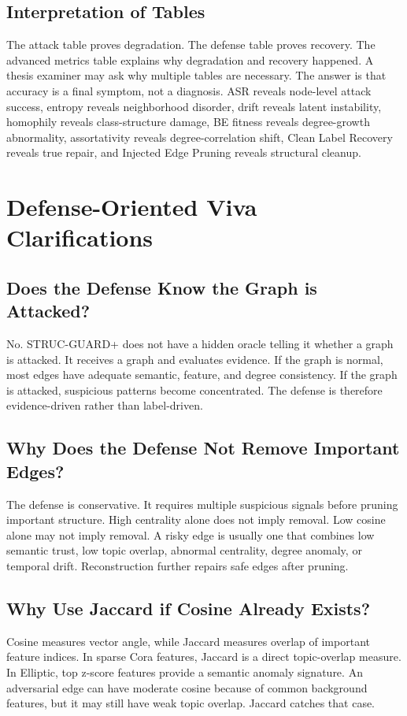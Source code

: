 \documentclass[12pt,oneside]{report}
\begin{document}
\section{Interpretation of Tables}
The attack table proves degradation. The defense table proves recovery. The advanced metrics table explains why degradation and recovery happened. A thesis examiner may ask why multiple tables are necessary. The answer is that accuracy is a final symptom, not a diagnosis. ASR reveals node-level attack success, entropy reveals neighborhood disorder, drift reveals latent instability, homophily reveals class-structure damage, BE fitness reveals degree-growth abnormality, assortativity reveals degree-correlation shift, Clean Label Recovery reveals true repair, and Injected Edge Pruning reveals structural cleanup.

\chapter{Defense-Oriented Viva Clarifications}

\section{Does the Defense Know the Graph is Attacked?}
No. STRUC-GUARD+ does not have a hidden oracle telling it whether a graph is attacked. It receives a graph and evaluates evidence. If the graph is normal, most edges have adequate semantic, feature, and degree consistency. If the graph is attacked, suspicious patterns become concentrated. The defense is therefore evidence-driven rather than label-driven.

\section{Why Does the Defense Not Remove Important Edges?}
The defense is conservative. It requires multiple suspicious signals before pruning important structure. High centrality alone does not imply removal. Low cosine alone may not imply removal. A risky edge is usually one that combines low semantic trust, low topic overlap, abnormal centrality, degree anomaly, or temporal drift. Reconstruction further repairs safe edges after pruning.

\section{Why Use Jaccard if Cosine Already Exists?}
Cosine measures vector angle, while Jaccard measures overlap of important feature indices. In sparse Cora features, Jaccard is a direct topic-overlap measure. In Elliptic, top z-score features provide a semantic anomaly signature. An adversarial edge can have moderate cosine because of common background features, but it may still have weak topic overlap. Jaccard catches that case.
\end{document}
